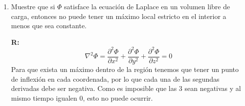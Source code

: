 \documentclass[]{article}
\numberwithin{equation}{section}
\newcommand{\0}{\textcolor{gray}{0}}
\newcommand{\la}{\nabla^2}
\newcommand{\eo}{\epsilon_{0}}
\newcommand{\pd}[2]{\dfrac{\partial #1}{\partial #2}}
\newcommand{\n}[1]{\mathbf{#1}}
\begin{document}
\begin{enumerate}
	\textbf{R:} 
	\begin{equation*}
		\rho = \rho_{0}\cdot\Theta(R - s)
	\end{equation*}
	Asumiendo \(\n{E} = E(s)\hat{\mathbf{s}}\), dentro del cilindro:
	\begin{align*}
		\oint_{S}\n{E}\cdot d\n{a} &= \dfrac{1}{\eo}\int_{0}\rho\, d^3 r\\
		2\pi s \cdot \ell \cdot E(s) &= \dfrac{1}{\eo}\cdot 2\pi \ell \int_{0}^{s<R}\rho_{0} s \, \Theta(R - s)\, ds\\
		2\pi s \cdot \ell \cdot E(s) &= \dfrac{1}{\eo}\cdot 2\pi \ell \frac{s^2}{2} \cdot \rho_{0}\\
		\Rightarrow E(s) &= \frac{1}{2 \eo} s \rho_{0}
	\end{align*}
	Fuera del cilindro:
	\begin{align*}
		\oint_{S}\n{E}\cdot d\n{a} &= \dfrac{1}{\eo}\int_{0}\rho\, d^3 r\\
		2\pi s \cdot \ell \cdot E(s) &= \dfrac{1}{\eo}\cdot 2\pi \ell \int_{0}^{s>R}\rho_{0} s \, \Theta(R - s)\, ds\\
		2\pi s \cdot \ell \cdot E(s) &= \dfrac{1}{\eo}\cdot 2\pi \ell \frac{R^2}{2} \cdot \rho_{0}\\
		\Rightarrow E(s) &= \frac{1}{2 \eo}\frac{R^2}{s} \rho_{0}
	\end{align*}
	
	\item Muestre que si \(\Phi\) satisface la ecuación de Laplace en un volumen libre de carga, entonces no puede tener un máximo local estricto en el interior a menos que sea constante.
	
	\textbf{R:} 
	\begin{equation*}
		\la\Phi = \pd{^2\Phi}{x^2} + \pd{^2\Phi}{y^2} + \pd{^2\Phi}{z^2} = 0
	\end{equation*}
	Para que exista un máximo dentro de la región tenemos que tener un punto de inflexión en cada coordenada, por lo que cada una de las segundas derivadas debe ser negativa. Como es imposible que las  3 sean negativas y al mismo tiempo igualen 0, esto no puede ocurrir.
\end{enumerate}
\end{document}

